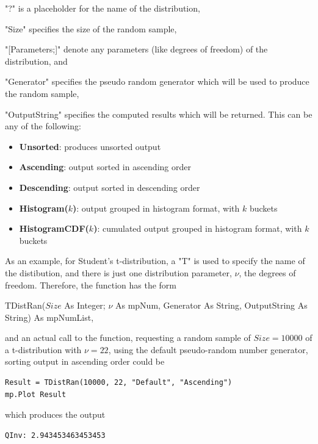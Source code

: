 "?" is a placeholder for the name of the distribution, 

"Size" specifies the size of the random sample, 

"[Parameters;]" denote any parameters (like degrees of freedom) of the distribution, and 

"Generator" specifies the pseudo random generator which will be used to produce the random sample, 

"OutputString" specifies the computed results which will be returned. This can be any of the following:

\begin{itemize}
	\item \textbf{Unsorted}: produces unsorted output
	\item \textbf{Ascending}: output sorted in ascending order
	\item \textbf{Descending}: output sorted in descending order
	\item \textbf{Histogram($k$)}: output grouped in histogram format, with $k$ buckets
	\item \textbf{HistogramCDF($k$)}: cumulated output grouped in histogram format, with $k$ buckets
	
\end{itemize}


\vspace{0.3cm}
As an example, for Student's t-distribution, a "T" is used to specify the name of the distibution, and there is just one distribution parameter, $\nu$, the degrees of freedom. Therefore,  the function has the form

\vspace{0.3cm}
\textsf{TDistRan($Size$ As Integer; $\nu$ As mpNum, Generator As String, OutputString As String) As mpNumList}, 

\vspace{0.3cm}
and an actual call to the function, requesting a random sample of  $Size=10000$ of a t-distribution with $\nu=22$, using the default pseudo-random number generator, sorting output in ascending order could be

\begin{lstlisting}
Result = TDistRan(10000, 22, "Default", "Ascending")
mp.Plot Result
\end{lstlisting}
which produces the output

\begin{verbatim}
QInv: 2.943453463453453
\end{verbatim}



